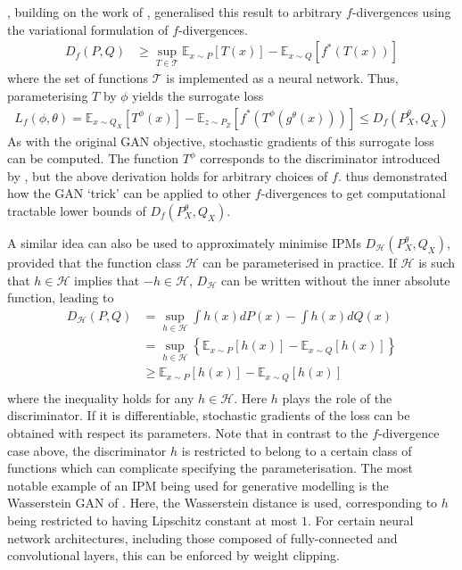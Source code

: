 \cite{nowozin2016f}, building on the work of \cite{nguyen10ratio}, generalised this result to arbitrary $f$-divergences using the variational formulation of $f$-divergences.
%
\begin{align*}
D_f(P, Q) &\geq \sup_{T \in \mathcal{T}} \mathbb{E}_{x \sim P} \left[ T(x) \right] - \mathbb{E}_{x \sim Q} \left[ f^*(T(x)) \right] 
\end{align*}
%
where the set of functions $\mathcal{T}$ is implemented as a neural network.
Thus, parameterising $T$ by $\phi$ yields the surrogate loss
%
\begin{align*}
L_f(\phi, \theta) = \mathbb{E}_{x \sim Q_X} \left[ T^\phi(x) \right] - \mathbb{E}_{z \sim P_Z} \left[ f^*(T^\phi(g^\theta(x))) \right] \leq D_f(P^\theta_X, Q_X)
\end{align*}
%
As with the original GAN objective, stochastic gradients of this surrogate loss can be computed. 
The function $T^\phi$ corresponds to the discriminator introduced by \cite{goodfellow2014generative}, but the above derivation holds for arbitrary choices of $f$. 
\cite{nowozin2016f} thus demonstrated how the GAN `trick' can be applied to other $f$-divergences to get computational tractable lower bounds of $D_f(P^\theta_X, Q_X)$.

A similar idea can also be used to approximately minimise IPMs $D_\mathcal{H}(P^\theta_X, Q_X)$, provided that the function class $\mathcal{H}$ can be parameterised in practice.
If $\mathcal{H}$ is such that $h \in \mathcal{H}$ implies that $-h \in \mathcal{H}$, $D_\mathcal{H}$ can be written without the inner absolute function, leading to
%
\begin{align*}
D_{\mathcal{H}}(P, Q) &= \sup_{h\in\mathcal{H}} \int h(x) dP(x) - \int h(x) dQ(x) \\
&= \sup_{h\in\mathcal{H}} \left\{ \mathbb{E}_{x \sim P} \left[ h(x) \right]- \mathbb{E}_{x \sim Q} \left[ h(x) \right] \right\} \\
&\geq  \mathbb{E}_{x \sim P} \left[ h(x) \right]- \mathbb{E}_{x \sim Q} \left[ h(x) \right] \\
\end{align*}
%
where the inequality holds for any $h \in \mathcal{H}$. 
Here $h$ plays the role of the discriminator. 
If it is differentiable, stochastic gradients of the loss can be obtained with respect its parameters.
Note that in contrast to the $f$-divergence case above, the discriminator $h$ is restricted to belong to a certain class of functions which can complicate specifying the parameterisation.
The most notable example of an IPM being used for generative modelling is the Wasserstein GAN of \cite{AB17}. 
Here, the Wasserstein distance is used, corresponding to $h$ being restricted to having Lipschitz constant at most $1$. 
For certain neural network architectures, including those composed of fully-connected and convolutional layers, this can be enforced by weight clipping.

